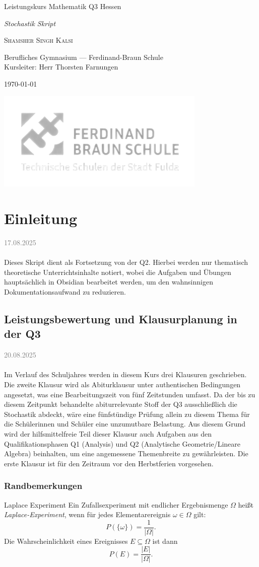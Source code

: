 \documentclass[11pt,a4paper,oneside]{article}
\newcommand{\lessondate}[1]{
	\noindent\hfill\textcolor{gray}{\textsc{#1}} \\
	\vspace{0.5cm}
}
\newcommand{\MakeArtTitle}[4]{%
	\begin{titlepage}
		\vspace*{18mm}
		\begin{center}
			\vspace{12mm}
			{\huge\color{TextCream} #1 \par}
			\vspace{6mm}
			{\Large\itshape\color{AccentBlue!50} #2 \par}
			\vspace{10mm}
			{\Large\scshape\color{TextCream} #3 \par}
			\vspace{6mm}
			{\small\color{MarginalGray} #4 \par}
			\vspace{5mm}
			{\small\color{MarginalGray} \today \par}
		\end{center}
		\vspace{7.5cm}
		\centering
		\includegraphics[width=0.75\textwidth]{2.png} %
	\end{titlepage}
}
\begin{document}
	
	\MakeArtTitle{
		Leistungskurs Mathematik Q3 Hessen}
		{Stochastik Skript}
		{Shamsher Singh Kalsi}
		{Berufliches Gymnasium — Ferdinand-Braun Schule \\ Kursleiter: Herr Thorsten Farnungen}
	
	\tableofcontents
	\bigskip
	\clearpage
	
	
	\section{Einleitung}
	\lessondate{17.08.2025}\\
	Dieses Skript dient als Fortsetzung von der Q2. Hierbei werden nur thematisch theoretische Unterrichtsinhalte notiert, wobei die Aufgaben und Übungen hauptsächlich in Obsidian bearbeitet werden, um den wahnsinnigen Dokumentationsaufwand zu reduzieren. 
	
	\subsection{Leistungsbewertung und Klausurplanung in der Q3}
	\lessondate{20.08.2025}\\
	Im Verlauf des Schuljahres werden in diesem Kurs drei Klausuren geschrieben.
	Die zweite Klausur wird als Abiturklausur unter authentischen Bedingungen angesetzt, was eine Bearbeitungszeit von fünf Zeitstunden umfasst. Da der bis zu diesem Zeitpunkt behandelte abiturrelevante Stoff der Q3 ausschließlich die Stochastik abdeckt, wäre eine fünfstündige Prüfung allein zu diesem Thema für die Schülerinnen und Schüler eine unzumutbare Belastung. 
	Aus diesem Grund wird der hilfsmittelfreie Teil dieser Klausur auch Aufgaben aus den Qualifikationsphasen Q1 (Analysis) und Q2 (Analytische Geometrie/Lineare Algebra) beinhalten, um eine angemessene Themenbreite zu gewährleisten.
	Die erste Klausur ist für den Zeitraum vor den Herbstferien vorgesehen.
	
	\subsubsection{Randbemerkungen}

	\begin{theo}{Laplace Experiment}
		Ein Zufallsexperiment mit endlicher Ergebnismenge $\Omega$ heißt
		\emph{Laplace-Experiment}, wenn für jedes Elementarereignis $\omega \in \Omega$
		gilt:
		\[
		P(\{\omega\}) = \frac{1}{|\Omega|}.
		\]
		Die Wahrscheinlichkeit eines Ereignisses $E \subseteq \Omega$ ist dann
		\[
		P(E) = \frac{|E|}{|\Omega|}.
		\]
	\end{theo}
	
\end{document}
